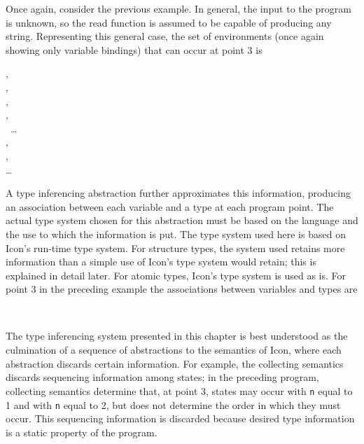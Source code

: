 Once again, consider the previous example. In general, the input to
the program is unknown, so the read function is assumed to be capable
of producing any string. Representing this general case, the set of
environments (once again showing only variable bindings) that can
occur at point 3 is

\goodbreak
\begin{specialcode}{}
\>\>[\texttt{s} = "", \texttt{n} = 1],\\
\>\>[\texttt{s} = "", \texttt{n} = 2],\\
\>\>[\texttt{s} = "a", \texttt{n} = 1],\\
\>\>[\texttt{s} = "a", \texttt{n} = 2],\\
\>\>\>\ \ldots\\
\>\>[\texttt{s} = "\texttt{abcd}", \texttt{n} = 1],\\
\>\>[\texttt{s} = "\texttt{abcd}", \texttt{n} = 2],\\
\>\>\> \ldots\\
\end{specialcode}


A type inferencing abstraction further approximates this information,
producing an association between each variable and a type at each
program point. The actual type system chosen for this abstraction must
be based on the language and the use to which the information is
put. The type system used here is based on Icon's run-time type
system. For structure types, the system used retains more information
than a simple use of Icon's type system would retain; this is
explained in detail later. For atomic types, Icon's type system is
used as is. For point 3 in the preceding example the associations
between variables and types are

\begin{specialcode}{}
\>\>[\texttt{s} = string, \texttt{n} = integer]\\
\end{specialcode}

The type inferencing system presented in this chapter is best
understood as the culmination of a sequence of abstractions to the
semantics of Icon, where each abstraction discards certain
information. For example, the collecting semantics discards sequencing
information among states; in the preceding program, collecting
semantics determine that, at point 3, states may occur with \texttt{n}
equal to 1 and with \texttt{n} equal to 2, but does not determine the
order in which they must occur. This sequencing information is
discarded because desired type information is a static property of the
program.


